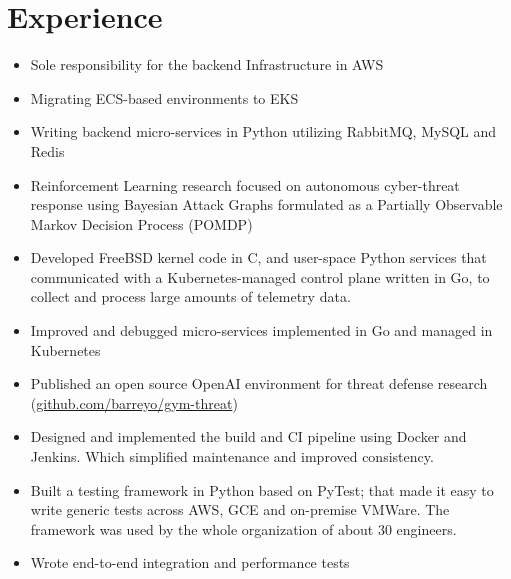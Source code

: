 \documentclass{cv_doc}
\begin{document}
\vspace{0.5cm}


\section*{Experience}


\begin{itemize}[label={\tiny\raisebox{1ex}{\textbullet}}]
  \item {Sole responsibility for the backend Infrastructure in AWS}
  \item {Migrating ECS-based environments to EKS}
  \item {Writing backend micro-services in Python utilizing RabbitMQ, MySQL and Redis}
\end{itemize}


\begin{itemize}[label={\tiny\raisebox{1ex}{\textbullet}}]
  \item {Reinforcement Learning research focused on autonomous cyber-threat response using Bayesian Attack Graphs formulated as a Partially Observable
  Markov Decision Process (POMDP)}
  \item {Developed FreeBSD kernel code in C, and user-space Python services that
  communicated with a Kubernetes-managed control plane written in Go, to
  collect and process large amounts of telemetry data.}
  \item {Improved and debugged micro-services implemented in Go and managed in Kubernetes}
  \item {Published an open source OpenAI environment for
  threat defense research \\
  (\href{https://github.com/barreyo/gym-threat}{github.com/barreyo/gym-threat}})
\end{itemize}


\begin{itemize}[label={\tiny\raisebox{1ex}{\textbullet}}]
  \item {Designed and implemented the build and CI pipeline using Docker and Jenkins. Which simplified maintenance and improved consistency.}
  \item {Built a testing framework in Python based on PyTest; that made it easy
  to write generic tests across AWS, GCE and on-premise VMWare. The framework
  was used by the whole organization of about 30 engineers.}
  \item {Wrote end-to-end integration and performance tests}
\end{itemize}
\end{document}
